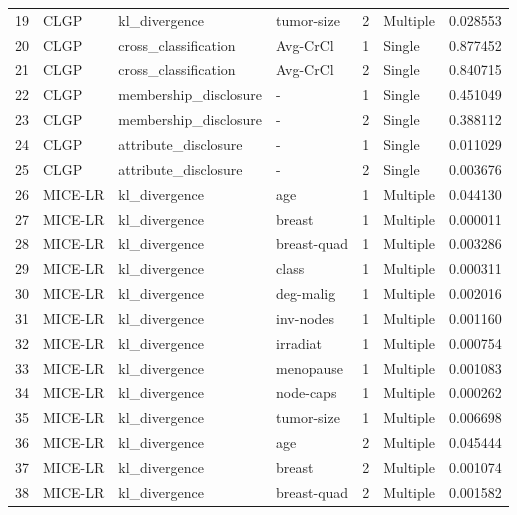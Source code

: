 \begin{tabular}{llllrlr}
19  &     CLGP &          kl\_divergence &   tumor-size &    2 &  Multiple &  0.028553 \\
20  &     CLGP &   cross\_classification &     Avg-CrCl &    1 &    Single &  0.877452 \\
21  &     CLGP &   cross\_classification &     Avg-CrCl &    2 &    Single &  0.840715 \\
22  &     CLGP &  membership\_disclosure &            - &    1 &    Single &  0.451049 \\
23  &     CLGP &  membership\_disclosure &            - &    2 &    Single &  0.388112 \\
24  &     CLGP &   attribute\_disclosure &            - &    1 &    Single &  0.011029 \\
25  &     CLGP &   attribute\_disclosure &            - &    2 &    Single &  0.003676 \\
26  &  MICE-LR &          kl\_divergence &          age &    1 &  Multiple &  0.044130 \\
27  &  MICE-LR &          kl\_divergence &       breast &    1 &  Multiple &  0.000011 \\
28  &  MICE-LR &          kl\_divergence &  breast-quad &    1 &  Multiple &  0.003286 \\
29  &  MICE-LR &          kl\_divergence &        class &    1 &  Multiple &  0.000311 \\
30  &  MICE-LR &          kl\_divergence &    deg-malig &    1 &  Multiple &  0.002016 \\
31  &  MICE-LR &          kl\_divergence &    inv-nodes &    1 &  Multiple &  0.001160 \\
32  &  MICE-LR &          kl\_divergence &     irradiat &    1 &  Multiple &  0.000754 \\
33  &  MICE-LR &          kl\_divergence &    menopause &    1 &  Multiple &  0.001083 \\
34  &  MICE-LR &          kl\_divergence &    node-caps &    1 &  Multiple &  0.000262 \\
35  &  MICE-LR &          kl\_divergence &   tumor-size &    1 &  Multiple &  0.006698 \\
36  &  MICE-LR &          kl\_divergence &          age &    2 &  Multiple &  0.045444 \\
37  &  MICE-LR &          kl\_divergence &       breast &    2 &  Multiple &  0.001074 \\
38  &  MICE-LR &          kl\_divergence &  breast-quad &    2 &  Multiple &  0.001582 \\

\end{tabular}

